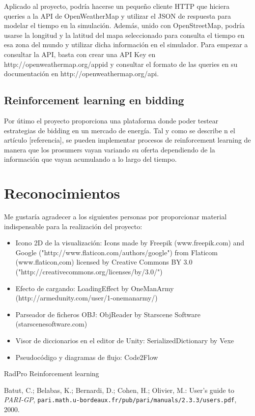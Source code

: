 \documentclass[12pt,a4paper,openright,oneside]{article}
\numberwithin{equation}{section}
\theoremstyle{definition}
\begin{document}
Aplicado al proyecto, podría hacerse un pequeño cliente HTTP que hiciera queries a la API de OpenWeatherMap y utilizar el JSON de respuesta para modelar el tiempo en la simulación. Además, unido con OpenStreetMap, podría usarse la longitud y la latitud del mapa seleccionado para consulta el tiempo en esa zona del mundo y utilizar dicha información en el simulador. Para empezar a consultar la API, basta con crear una API Key en http://openweathermap.org/appid y consultar el formato de las queries en su documentación en http://openweathermap.org/api.

\subsection{Reinforcement learning en bidding}
Por útimo el proyecto proporciona una plataforma donde poder testear estrategias de bidding en un mercado de energía. Tal y como se describe n el artículo [referencia], se pueden implementar procesos de reinforcement learning de manera que los prosumers vayan variando su oferta dependiendo de la información que vayan acumulando a lo largo del tiempo.




\normalfont

\newpage

\section*{Reconocimientos}
Me gustaría agradecer a los siguientes personas por proporcionar material indispensable para la realización del proyecto:

\begin{itemize}

\item Icono 2D de la visualización: Icons made by Freepik (www.freepik.com) and Google ("http://www.flaticon.com/authors/google") from Flaticom (www.flaticon,com) licensed by Creative Commons BY 3.0 ("http://creativecommons.org/licenses/by/3.0/")

\item Efecto de cargando: LoadingEffect by OneManArmy (http://armedunity.com/user/1-onemanarmy/)

\item Parseador de ficheros OBJ: ObjReader by Starscene Software (starscenesoftware.com)

\item Visor de diccionarios en el editor de Unity: SerializedDictionary by Vexe 

\item Pseudocódigo y diagramas de flujo: Code2Flow

\end{itemize}
\newpage


\begin{thebibliography}{25}
 RadPro
 Reinforcement learning

 Batut, C.; Belabas, K.; Bernardi, D.; Cohen, H.; Olivier, M.: User's guide to \textit{PARI-GP},  \newline \texttt{pari.math.u-bordeaux.fr/pub/pari/manuals/2.3.3/users.pdf}, 2000.
\end{thebibliography}
\end{document}
